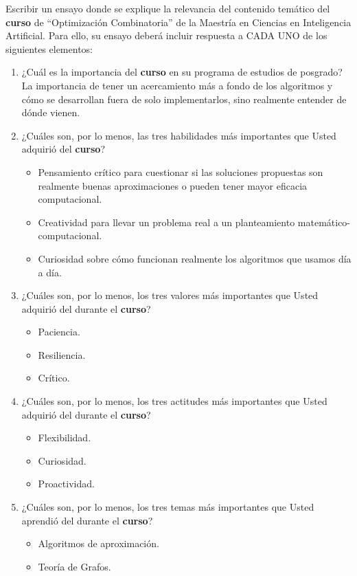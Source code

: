 Escribir un ensayo donde se explique la relevancia del contenido temático del \textbf{curso} de ``Optimización Combinatoria'' de la Maestría
en Ciencias en Inteligencia Artificial. Para ello, su ensayo deberá incluir respuesta a CADA UNO de los siguientes elementos:

\begin{enumerate}
\item ¿Cuál es la importancia del \textbf{curso} en su programa de estudios de posgrado?\\
La importancia de tener un acercamiento más a fondo de los algoritmos y cómo se desarrollan fuera de solo implementarlos,
sino realmente entender de dónde vienen.
\item ¿Cuáles son, por lo menos, las tres habilidades más importantes que Usted adquirió del \textbf{curso}?  
\begin{itemize}
\item Pensamiento crítico para cuestionar si las soluciones propuestas son realmente buenas aproximaciones o pueden tener mayor eficacia computacional.
\item Creatividad para llevar un problema real a un planteamiento matemático-computacional.
\item Curiosidad sobre cómo funcionan realmente los algoritmos que usamos día a día.
\end{itemize}
\item ¿Cuáles son, por lo menos, los tres valores más importantes que Usted adquirió del durante el \textbf{curso}?  
\begin{itemize}
\item Paciencia.
\item Resiliencia.
\item Crítico.
\end{itemize}
\item ¿Cuáles son, por lo menos, los tres actitudes más importantes que Usted adquirió del durante el \textbf{curso}?  
\begin{itemize}
\item Flexibilidad.
\item Curiosidad.
\item Proactividad.
\end{itemize}
\item ¿Cuáles son, por lo menos, los tres temas más importantes que Usted aprendió del durante el \textbf{curso}?  
\begin{itemize}
\item Algoritmos de aproximación.
\item Teoría de Grafos.

\end{itemize}
\end{enumerate}
